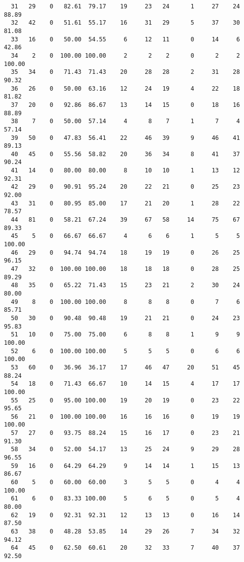 \begin{verbatim}
  31   29    0   82.61  79.17    19     23   24      1     27    24    88.89
  32   42    0   51.61  55.17    16     31   29      5     37    30    81.08
  33   16    0   50.00  54.55     6     12   11      0     14     6    42.86
  34    2    0  100.00 100.00     2      2    2      0      2     2   100.00
  35   34    0   71.43  71.43    20     28   28      2     31    28    90.32
  36   26    0   50.00  63.16    12     24   19      4     22    18    81.82
  37   20    0   92.86  86.67    13     14   15      0     18    16    88.89
  38    7    0   50.00  57.14     4      8    7      1      7     4    57.14
  39   50    0   47.83  56.41    22     46   39      9     46    41    89.13
  40   45    0   55.56  58.82    20     36   34      8     41    37    90.24
  41   14    0   80.00  80.00     8     10   10      1     13    12    92.31
  42   29    0   90.91  95.24    20     22   21      0     25    23    92.00
  43   31    0   80.95  85.00    17     21   20      1     28    22    78.57
  44   81    0   58.21  67.24    39     67   58     14     75    67    89.33
  45    5    0   66.67  66.67     4      6    6      1      5     5   100.00
  46   29    0   94.74  94.74    18     19   19      0     26    25    96.15
  47   32    0  100.00 100.00    18     18   18      0     28    25    89.29
  48   35    0   65.22  71.43    15     23   21      2     30    24    80.00
  49    8    0  100.00 100.00     8      8    8      0      7     6    85.71
  50   30    0   90.48  90.48    19     21   21      0     24    23    95.83
  51   10    0   75.00  75.00     6      8    8      1      9     9   100.00
  52    6    0  100.00 100.00     5      5    5      0      6     6   100.00
  53   60    0   36.96  36.17    17     46   47     20     51    45    88.24
  54   18    0   71.43  66.67    10     14   15      4     17    17   100.00
  55   25    0   95.00 100.00    19     20   19      0     23    22    95.65
  56   21    0  100.00 100.00    16     16   16      0     19    19   100.00
  57   27    0   93.75  88.24    15     16   17      0     23    21    91.30
  58   34    0   52.00  54.17    13     25   24      9     29    28    96.55
  59   16    0   64.29  64.29     9     14   14      1     15    13    86.67
  60    5    0   60.00  60.00     3      5    5      0      4     4   100.00
  61    6    0   83.33 100.00     5      6    5      0      5     4    80.00
  62   19    0   92.31  92.31    12     13   13      0     16    14    87.50
  63   38    0   48.28  53.85    14     29   26      7     34    32    94.12
  64   45    0   62.50  60.61    20     32   33      7     40    37    92.50

\end{verbatim}
